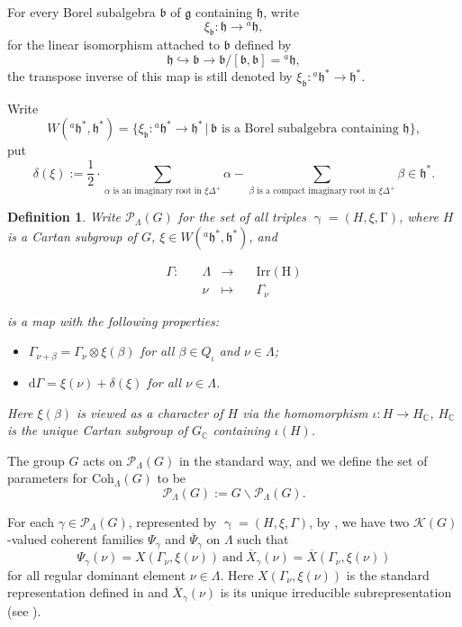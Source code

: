 \documentclass[12pt, a4paper]{amsart}
\numberwithin{equation}{section}
\newtheorem{defn}[thm]{Definition}
\newcommand{\BC}{{\mathbb {C}}}
\newcommand{\CK}{{\mathcal {K}}}
\newcommand{\CP}{{\mathcal {P}}}
\newcommand{\fb}{\mathfrak{b}}
\newcommand{\fg}{\mathfrak{g}}
\newcommand{\fh}{\mathfrak{h}}
\newcommand{\set}[2]{\{#1\,|\,#2\}}
\newcommand{\defmap}[5]{
           \begin{equation*}
              \begin{aligned}
                   #1:\quad  & #2 &\longrightarrow &\quad #3 \\
                      \quad  & #4    &\longmapsto  &\quad #5
              \end{aligned}
           \end{equation*}
          }
\renewcommand{\bar}{\overline}
\begin{document}
For every Borel subalgebra $\fb$ of $\fg$ containing $\fh$, write
$$\xi_{\fb}: \fh \to {^{a}\fh},$$
for the linear isomorphism attached to $\fb$ defined by
$$\fh \hookrightarrow \fb \to \fb / [\fb , \fb] =  {^{a}\fh},$$
the transpose inverse of this map is still denoted by $\xi_{\fb}: {^{a}\fh^*} \to \fh^*$.

Write
\begin{equation}
    W(^{a}\fh^*,\fh^*) = \set{\xi_{\fb}: {^{a}\fh}^* \to \fh^*}{\textrm{$\fb$ is a Borel subalgebra containing $\fh$}},
\end{equation}
put
\begin{equation}
    \delta(\xi) := \frac{1}{2} \cdot \sum_{\textrm{$\alpha$ is an imaginary root in $\xi \Delta^{+}$}}\alpha - \sum_{\textrm{$\beta$ is a compact imaginary root in $\xi \Delta^{+}$}}\beta \in \fh^*.
\end{equation}

\begin{defn}\label{regular character}
    Write $\mathscr{P}_{\Lambda}(G)$ for the set of all triples $\upgamma = (H,\xi,\mathrm{\Gamma})$, where $H$ is a Cartan subgroup of $G$, $\xi \in W(^{a}\fh^*,\fh^*)$, and
    \defmap{\Gamma}{\Lambda}{\mathrm{Irr(H)}}{\nu}{\Gamma_{\nu}}
    is a map with the following properties:
    \begin{itemize}
        \item $\Gamma_{\nu+\beta} = \Gamma_{\nu} \otimes \xi(\beta)$ for all $\beta \in Q_{\iota}$ and $\nu \in \Lambda$;
        \item $\mathrm{d}\Gamma = \xi(\nu) + \delta(\xi)$ for all $\nu \in \Lambda$.
    \end{itemize}
    Here $\xi(\beta)$ is viewed as a character of $H$ via the homomorphism $\iota: H \to H_{\BC}$, $H_{\BC}$ is the unique Cartan subgroup of $G_{\BC}$ containing $\iota(H)$.
\end{defn}

The group $G$ acts on $\mathscr{P}_{\Lambda}(G)$ in the standard way, and we define the set of parameters for $\mathrm{Coh}_{\Lambda}(G)$ to be
\begin{equation}
    \CP_{\Lambda}(G) := G \backslash \mathscr{P}_{\Lambda}(G) .
\end{equation}

For each $\gamma \in \CP_{\Lambda}(G)$, represented by $\upgamma = (H,\xi,\Gamma)$, by \cite[Theorem 8.2.1]{Vog81}, we have two $\CK(G)$-valued coherent families $\Psi_{\gamma}$ and $\bar{\Psi}_{\gamma}$ on $\Lambda$ such that
$$\Psi_{\gamma}(\nu) = X(\Gamma_{\nu},\xi(\nu)) \ \textrm{and}  \ \bar{X}_{\gamma}(\nu) = \bar{X}(\Gamma_{\nu},\xi(\nu))$$
for all regular dominant element $\nu \in \Lambda$. Here $X(\Gamma_{\nu},\xi(\nu))$ is the standard representation defined in \cite[Notation Convention 6.6.3]{Vog81} and $\bar{X}_{\gamma}(\nu)$ is its unique irreducible subrepresentation (see \cite[Theorem 6.5.12]{Vog81}).
\end{document}
